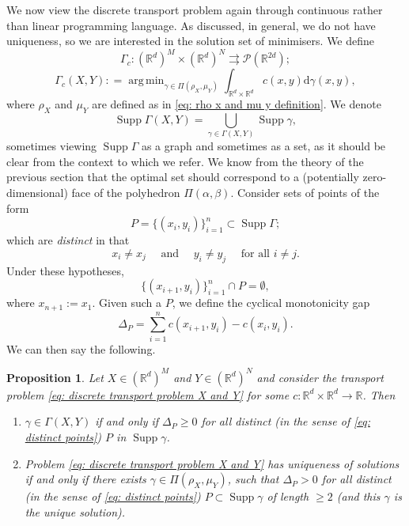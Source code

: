\documentclass[11pt, oneside, titlepage]{book}
\theoremstyle{plain}
\newtheorem{proposition}[theorem]{Proposition}
\theoremstyle{definition}
\newcommand{\R}{\mathbb{R}}
\newcommand{\di}{\mathrm{d}}
\DeclareMathOperator{\supp}{Supp}
\DeclareMathOperator*{\argmin}{arg\,\min}
\begin{document}
We now view the discrete transport problem again through continuous rather than linear programming language. As discussed, in general, we do not have uniqueness, so we are interested in the solution set of minimisers. We define
\begin{equation*}
        \Gamma_c : (\R^d)^M \times (\R^d)^N \rightrightarrows {\mathcal{P}(\R^{2d})}; 
 \end{equation*}
\begin{equation}
\label{eq: discrete transport problem X and Y}
    \Gamma_c(X, Y) : = \argmin_{\gamma \in \Pi(\rho_X, \mu_Y)} \int_{\R^d \times \R^d} c(x, y) \di \gamma(x, y),
\end{equation}
where $\rho_X$ and $\mu_Y$ are defined as in \eqref{eq: rho x and mu y definition}. We denote
\begin{equation*}
    \supp \Gamma(X, Y) = \bigcup_{\gamma \in \Gamma(X, Y)} \supp \gamma,
\end{equation*}
sometimes viewing $\supp \Gamma$ as a graph and sometimes as a set, as it should be clear from the context to which we refer. We know from the theory of the previous section that the optimal set should correspond to a (potentially zero-dimensional) face of the polyhedron $\Pi(\alpha, \beta)$. 
Consider sets of points of the form
\begin{equation*}
    P = \{(x_i, y_i)\}_{i=1}^n \subset \supp \Gamma;
\end{equation*}
which are \textit{distinct} in that
\begin{equation}
\label{eq: distinct points}
  x_i \neq x_j \quad\text{ and }\quad y_i \neq y_j \quad \text{ for all } i \neq j.  
\end{equation}
Under these hypotheses,
\begin{equation}
\label{eq: distinct shift gives new set}
    \{(x_{i+1}, y_i)\}_{i=1}^n \cap P = \emptyset,
\end{equation}
where $x_{n+1} := x_1$. Given such a $P$, we define the cyclical monotonicity gap
\begin{equation*}
    \Delta_P = \sum_{i=1}^n c(x_{i+1}, y_i) - c(x_i, y_i).
\end{equation*}
 We can then say the following.
\begin{proposition}
\label{prop: uniqueness iff strict cm}
    Let $X \in (\R^d)^M$ and $Y \in (\R^d)^N$ and consider the transport problem \eqref{eq: discrete transport problem X and Y} for some $c: \R^d \times \R^d \to \R$. Then
    \begin{enumerate}[label=(\roman*)]
        \item \label{enum: weak inequality} $\gamma \in \Gamma(X, Y)$ if and only if $\Delta_P \geq 0$ for all distinct (in the sense of \eqref{eq: distinct points}) $P$ in $\supp \gamma$.
        \item \label{enum: strict gives uniqueness} Problem \eqref{eq: discrete transport problem X and Y} has uniqueness of solutions if and only if there exists $\gamma \in \Pi(\rho_X, \mu_Y)$, such that $\Delta_P > 0$ for all distinct (in the sense of \eqref{eq: distinct points}) $P \subset \supp \gamma$ of length $\geq 2$ (and this $\gamma$ is the unique solution).
    \end{enumerate}
\end{proposition}
\end{document}
